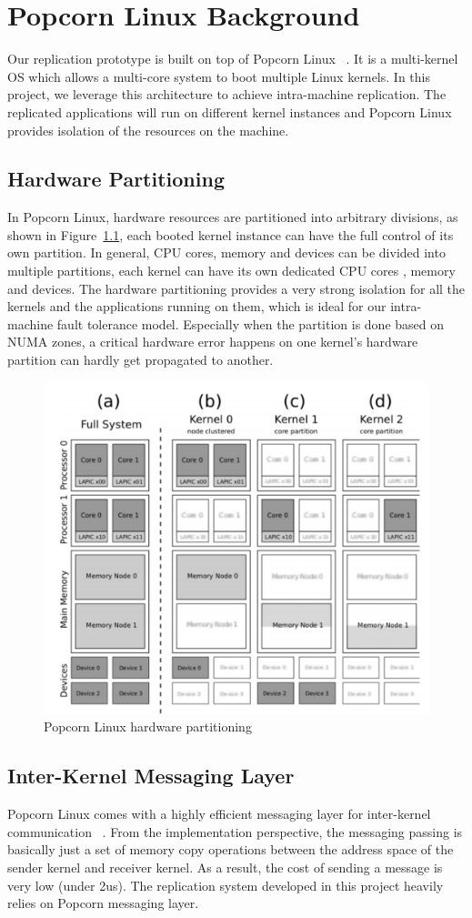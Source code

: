 \chapter{Popcorn Linux Background}
Our replication prototype is built on top of Popcorn Linux ~\cite{barbalace2014popcorn}. It is a multi-kernel OS which allows a multi-core system to boot multiple Linux kernels. In this project, we leverage this architecture to achieve intra-machine replication. The replicated applications will run on different kernel instances and Popcorn Linux provides isolation of the resources on the machine.
\section{Hardware Partitioning}
In Popcorn Linux, hardware resources are partitioned into arbitrary divisions, as shown in Figure~\ref{f:popcorn_arch}, each booted kernel instance can have the full control of its own partition. In general, CPU cores, memory and devices can be divided into multiple partitions, each kernel can have its own dedicated CPU cores , memory and devices. The hardware partitioning provides a very strong isolation for all the kernels and the applications running on them, which is ideal for our intra-machine fault tolerance model. Especially when the partition is done based on NUMA zones, a critical hardware error happens on one kernel's hardware partition can hardly get propagated to another.

\begin{figure}[!ht]
\centering
\includegraphics[width=.6\columnwidth]{figures/popcorn_arch}
 \caption{Popcorn Linux hardware partitioning}
 \label{f:popcorn_arch}
\end{figure}

\section{Inter-Kernel Messaging Layer}
Popcorn Linux comes with a highly efficient messaging layer for inter-kernel communication ~\cite{shelton2013popcorn}. From the implementation perspective, the messaging passing is basically just a set of memory copy operations between the address space of the sender kernel and receiver kernel. As a result, the cost of sending a message is very low (under 2us). The replication system developed in this project heavily relies on Popcorn messaging layer.

